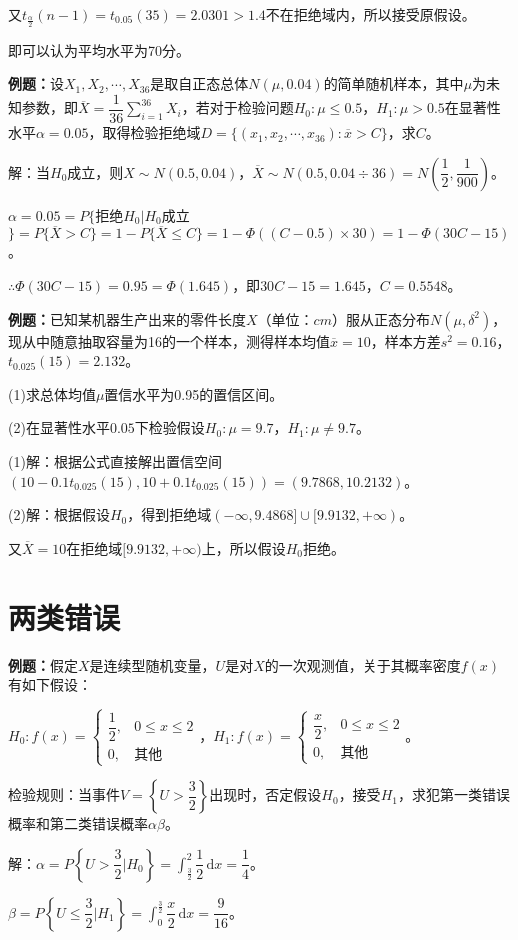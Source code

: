 \documentclass[UTF8, 12pt]{ctexart}
\begin{document}
又$t_{\frac{\alpha}{2}}(n-1)=t_{0.05}(35)=2.0301>1.4$不在拒绝域内，所以接受原假设。

即可以认为平均水平为70分。

\textbf{例题：}设$X_1,X_2,\cdots,X_{36}$是取自正态总体$N(\mu,0.04)$的简单随机样本，其中$\mu$为未知参数，即$\overline{X}=\dfrac{1}{36}\sum\limits_{i=1}^{36}X_i$，若对于检验问题$H_0:\mu\leqslant0.5$，$H_1:\mu>0.5$在显著性水平$\alpha=0.05$，取得检验拒绝域$D=\{(x_1,x_2,\cdots,x_{36}):\overline{x}>C\}$，求$C$。

解：当$H_0$成立，则$X\sim N(0.5,0.04)$，$\overline{X}\sim N(0.5,0.04\div36)=N\left(\dfrac{1}{2},\dfrac{1}{900}\right)$。

$\alpha=0.05=P\{$拒绝$H_0|H_0$成立$\}=P\{\overline{X}>C\}=1-P\{\overline{X}\leqslant C\}=1-\varPhi((C-0.5)\times30)=1-\varPhi(30C-15)$。

$\therefore\varPhi(30C-15)=0.95=\varPhi(1.645)$，即$30C-15=1.645$，$C=0.5548$。

\textbf{例题：}已知某机器生产出来的零件长度$X$（单位：$cm$）服从正态分布$N(\mu,\delta^2)$，现从中随意抽取容量为16的一个样本，测得样本均值$\overline{x}=10$，样本方差$s^2=0.16$，$t_{0.025}(15)=2.132$。

(1)求总体均值$\mu$置信水平为0.95的置信区间。

(2)在显著性水平$0.05$下检验假设$H_0:\mu=9.7$，$H_1:\mu\neq9.7$。

(1)解：根据公式直接解出置信空间$(10-0.1t_{0.025}(15),10+0.1t_{0.025}(15))=(9.7868,10.2132)$。

(2)解：根据假设$H_0$，得到拒绝域$(-\infty,9.4868]\cup[9.9132,+\infty)$。

又$\overline{X}=10$在拒绝域$[9.9132,+\infty)$上，所以假设$H_0$拒绝。

\section{两类错误}

\textbf{例题：}假定$X$是连续型随机变量，$U$是对$X$的一次观测值，关于其概率密度$f(x)$有如下假设：

$H_0:f(x)=\left\{\begin{array}{ll}
    \dfrac{1}{2}, & 0\leqslant x\leqslant2 \\
    0, & \text{其他}
\end{array}\right.$，$H_1:f(x)=\left\{\begin{array}{ll}
    \dfrac{x}{2}, & 0\leqslant x\leqslant2 \\
    0, & \text{其他}
\end{array}\right.$。

检验规则：当事件$V=\left\{U>\dfrac{3}{2}\right\}$出现时，否定假设$H_0$，接受$H_1$，求犯第一类错误概率和第二类错误概率$\alpha\beta$。

解：$\alpha=P\left\{U>\dfrac{3}{2}\bigg|H_0\right\}=\displaystyle{\int_\frac{3}{2}^2\dfrac{1}{2}\,\textrm{d}x=\dfrac{1}{4}}$。

$\beta=P\left\{U\leqslant\dfrac{3}{2}\bigg|H_1\right\}=\displaystyle{\int_0^{\frac{3}{2}}\dfrac{x}{2}\,\textrm{d}x=\dfrac{9}{16}}$。
\end{document}
